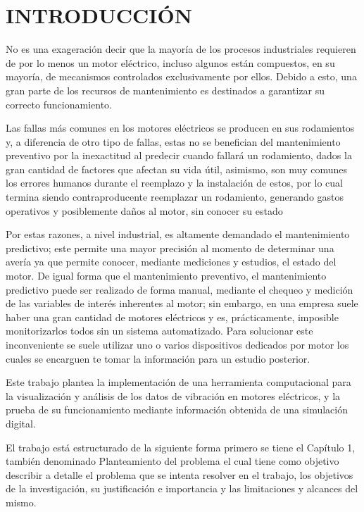 \thispagestyle{empty}
\section*{INTRODUCCIÓN}

No es una exageración decir que la mayoría de los procesos industriales
requieren de por lo menos un motor eléctrico, incluso algunos están compuestos, en su
mayoría, de mecanismos controlados exclusivamente por ellos. Debido a esto,
una gran parte de los recursos de mantenimiento es destinados a garantizar
su correcto funcionamiento.

Las fallas más comunes en los motores eléctricos se producen en sus rodamientos
y, a diferencia de otro tipo de fallas, estas no se benefician
del mantenimiento preventivo por la inexactitud al predecir cuando
fallará un rodamiento, dados la gran cantidad de factores que afectan su vida útil,
asimismo, son muy comunes los errores humanos durante el reemplazo y la instalación de
estos, por lo
cual termina siendo contraproducente reemplazar un rodamiento,
generando gastos operativos y posiblemente daños al motor,
sin conocer su estado

Por estas razones, a nivel industrial, es altamente demandado el mantenimiento
predictivo; este permite una mayor precisión al momento de determinar una avería
ya que permite conocer, mediante mediciones y estudios, el estado del motor.
De igual forma que el mantenimiento preventivo, el mantenimiento predictivo puede
ser realizado de forma manual, mediante el chequeo y medición de las variables de
interés inherentes al motor; sin embargo, en una empresa suele haber una gran cantidad
de motores eléctricos y es, prácticamente, imposible monitorizarlos todos sin un sistema
automatizado. Para solucionar este inconveniente se suele utilizar
uno o varios dispositivos dedicados por motor los cuales se encarguen te tomar
la información para un estudio posterior.

Este trabajo plantea la implementación de una herramienta computacional para la
visualización y análisis de los datos de vibración en motores eléctricos, y la
prueba de su funcionamiento mediante información obtenida de una
simulación digital.

El trabajo está estructurado de la siguiente forma primero se tiene el Capítulo
1, también denominado Planteamiento del problema el cual tiene como objetivo
describir a detalle el problema que se intenta resolver en el trabajo, los
objetivos de la investigación, su justificación e importancia y las
limitaciones y alcances del mismo.

